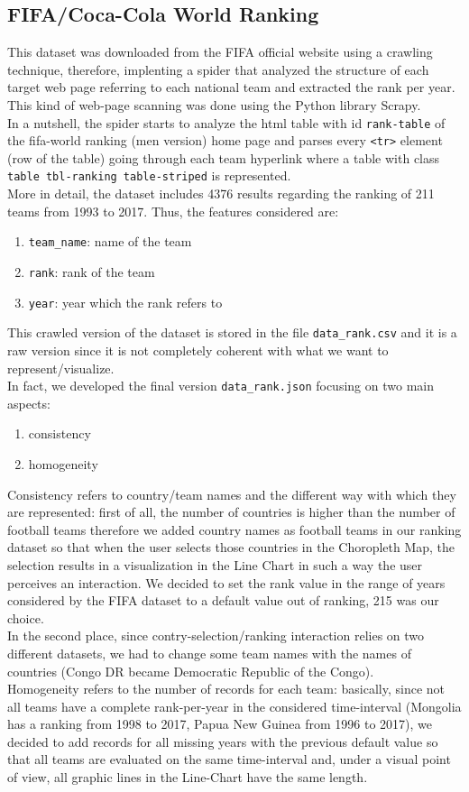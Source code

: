 \documentclass[journal]{vgtc}                %
\begin{document}
\subsection{FIFA/Coca-Cola World Ranking}
This dataset was downloaded from the FIFA official website using a crawling technique, therefore, implenting a spider that analyzed the structure of each target web page referring to each national team and extracted the rank per year. This kind of web-page scanning was done using the Python library Scrapy. \\
In a nutshell, the spider starts to analyze the html table with id \texttt{rank-table} of the fifa-world ranking (men version) home page and parses every \texttt{<tr>} element (row of the table) going through each team hyperlink where a table with class \texttt{table tbl-ranking table-striped} is represented. \\
More in detail, the dataset includes 4376 results regarding the ranking of 211 teams from 1993 to 2017. Thus, the features considered are:
\begin{enumerate}
\item \texttt{team\_name}: name of the team
\item \texttt{rank}: rank of the team
\item \texttt{year}: year which the rank refers to
\end{enumerate}
This crawled version of the dataset is stored in the file \texttt{data\_rank.csv} and it is a raw version since it is not completely coherent with what we want to represent/visualize. \\ In fact, we developed the final version \texttt{data\_rank.json} focusing on two main aspects:
\begin{enumerate}
\item consistency
\item homogeneity
\end{enumerate}
Consistency refers to country/team names and the different way with which they are represented: first of all, the number of countries is higher than the number of football teams therefore we added country names as football teams in our ranking dataset so that when the user selects those countries in the Choropleth Map, the selection results in a visualization in the Line Chart in such a way the user perceives an interaction. We decided to set the rank value in the range of years considered by the FIFA dataset to a default value out of ranking, 215 was our choice. \\
In the second place, since contry-selection/ranking interaction relies on two different datasets, we had to change some team names with the names of countries (Congo DR became Democratic Republic of the Congo). \\
Homogeneity refers to the number of records for each team: basically, since not all teams have a complete rank-per-year in the considered time-interval (Mongolia has a ranking from 1998 to 2017, Papua New Guinea from 1996 to 2017), we decided to add records for all missing years with the previous default value so that all teams are evaluated on the same time-interval and, under a visual point of view, all graphic lines in the Line-Chart have the same length. 
\end{document}
